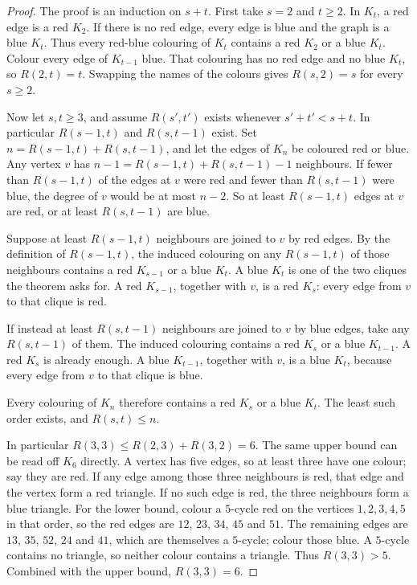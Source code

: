 \begin{proof}
The proof is an induction on $s+t$. First take $s=2$ and $t\ge2$. In $K_t$, a red edge is a red $K_2$. If there is no red edge, every edge is blue and the graph is a blue $K_t$. Thus every red-blue colouring of $K_t$ contains a red $K_2$ or a blue $K_t$. Colour every edge of $K_{t-1}$ blue. That colouring has no red edge and no blue $K_t$, so $R(2,t)=t$. Swapping the names of the colours gives $R(s,2)=s$ for every $s\ge2$.

Now let $s,t\ge3$, and assume $R(s',t')$ exists whenever $s'+t'<s+t$. In particular $R(s-1,t)$ and $R(s,t-1)$ exist. Set $n=R(s-1,t)+R(s,t-1)$, and let the edges of $K_n$ be coloured red or blue. Any vertex $v$ has $n-1=R(s-1,t)+R(s,t-1)-1$ neighbours. If fewer than $R(s-1,t)$ of the edges at $v$ were red and fewer than $R(s,t-1)$ were blue, the degree of $v$ would be at most $n-2$. So at least $R(s-1,t)$ edges at $v$ are red, or at least $R(s,t-1)$ are blue.

Suppose at least $R(s-1,t)$ neighbours are joined to $v$ by red edges. By the definition of $R(s-1,t)$, the induced colouring on any $R(s-1,t)$ of those neighbours contains a red $K_{s-1}$ or a blue $K_t$. A blue $K_t$ is one of the two cliques the theorem asks for. A red $K_{s-1}$, together with $v$, is a red $K_s$: every edge from $v$ to that clique is red.

If instead at least $R(s,t-1)$ neighbours are joined to $v$ by blue edges, take any $R(s,t-1)$ of them. The induced colouring contains a red $K_s$ or a blue $K_{t-1}$. A red $K_s$ is already enough. A blue $K_{t-1}$, together with $v$, is a blue $K_t$, because every edge from $v$ to that clique is blue.

Every colouring of $K_n$ therefore contains a red $K_s$ or a blue $K_t$. The least such order exists, and $R(s,t)\le n$.

In particular $R(3,3)\le R(2,3)+R(3,2)=6$. The same upper bound can be read off $K_6$ directly. A vertex has five edges, so at least three have one colour; say they are red. If any edge among those three neighbours is red, that edge and the vertex form a red triangle. If no such edge is red, the three neighbours form a blue triangle. For the lower bound, colour a $5$-cycle red on the vertices $1,2,3,4,5$ in that order, so the red edges are $12$, $23$, $34$, $45$ and $51$. The remaining edges are $13$, $35$, $52$, $24$ and $41$, which are themselves a $5$-cycle; colour those blue. A $5$-cycle contains no triangle, so neither colour contains a triangle. Thus $R(3,3)>5$. Combined with the upper bound, $R(3,3)=6$.
\end{proof}

